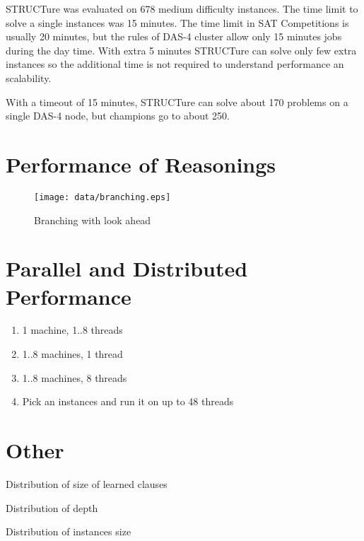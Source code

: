 STRUCTure was evaluated on 678 medium difficulty instances.
The time limit to solve a single instances was 15 minutes.  The time
limit in SAT Competitions is usually 20 minutes, but the rules
of DAS-4 cluster allow only 15 minutes jobs during the day time.
With extra 5 minutes STRUCTure can solve only few extra instances
so the additional time is not required to understand performance
an scalability.


With a timeout of 15 minutes, STRUCTure can solve about 170 problems
on a single DAS-4 node, but champions go to about 250.



\section{Performance of Reasonings}

\begin{figure}[h]
  \centering
  \texttt{[image: data/branching.eps]}
  \caption{Branching with look ahead}
  \label{fig:branching-w-la}
\end{figure}

\section{Parallel and Distributed Performance}

\begin{enumerate}
  \item 1 machine, 1..8 threads
  \item 1..8 machines, 1 thread
  \item 1..8 machines, 8 threads
  \item Pick an instances and run it on up to 48 threads
\end{enumerate}


\section{Other}

Distribution of size of learned clauses 

Distribution of depth

Distribution of instances size
